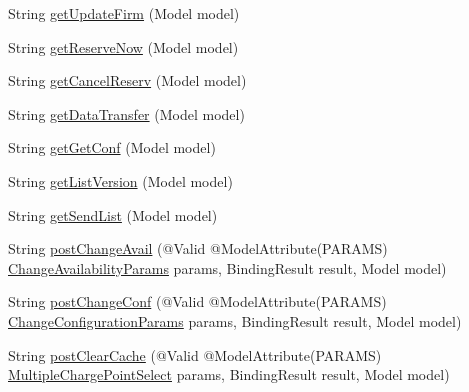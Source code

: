 \begin{DoxyCompactItemize}
\item 
String \hyperlink{classde_1_1rwth_1_1idsg_1_1steve_1_1web_1_1controller_1_1_ocpp15_controller_abbd25891039a971d12dd168ff41d62d2}{get\-Update\-Firm} (Model model)
\item 
String \hyperlink{classde_1_1rwth_1_1idsg_1_1steve_1_1web_1_1controller_1_1_ocpp15_controller_a9ca5f5a51a04291f02d36cdc997f5424}{get\-Reserve\-Now} (Model model)
\item 
String \hyperlink{classde_1_1rwth_1_1idsg_1_1steve_1_1web_1_1controller_1_1_ocpp15_controller_a6f60b7bd2cc240f33cd0428e0ba22d48}{get\-Cancel\-Reserv} (Model model)
\item 
String \hyperlink{classde_1_1rwth_1_1idsg_1_1steve_1_1web_1_1controller_1_1_ocpp15_controller_a6c30b64fcd1d51f7e07601d53328ae40}{get\-Data\-Transfer} (Model model)
\item 
String \hyperlink{classde_1_1rwth_1_1idsg_1_1steve_1_1web_1_1controller_1_1_ocpp15_controller_a3082a555e44506461f53a079ea49a5d5}{get\-Get\-Conf} (Model model)
\item 
String \hyperlink{classde_1_1rwth_1_1idsg_1_1steve_1_1web_1_1controller_1_1_ocpp15_controller_a5642b728ccf142aac65269bdf1d1252d}{get\-List\-Version} (Model model)
\item 
String \hyperlink{classde_1_1rwth_1_1idsg_1_1steve_1_1web_1_1controller_1_1_ocpp15_controller_a08bb9d23d18ef3d73b58bfd4d19abb5d}{get\-Send\-List} (Model model)
\item 
String \hyperlink{classde_1_1rwth_1_1idsg_1_1steve_1_1web_1_1controller_1_1_ocpp15_controller_ab0b8784fb93aa4060bac7b0620a5d1d1}{post\-Change\-Avail} (@Valid @Model\-Attribute(P\-A\-R\-A\-M\-S) \hyperlink{classde_1_1rwth_1_1idsg_1_1steve_1_1web_1_1dto_1_1ocpp12_1_1_change_availability_params}{Change\-Availability\-Params} params, Binding\-Result result, Model model)
\item 
String \hyperlink{classde_1_1rwth_1_1idsg_1_1steve_1_1web_1_1controller_1_1_ocpp15_controller_af68f700ce39665d52d076a055ac0727d}{post\-Change\-Conf} (@Valid @Model\-Attribute(P\-A\-R\-A\-M\-S) \hyperlink{classde_1_1rwth_1_1idsg_1_1steve_1_1web_1_1dto_1_1ocpp12_1_1_change_configuration_params}{Change\-Configuration\-Params} params, Binding\-Result result, Model model)
\item 
String \hyperlink{classde_1_1rwth_1_1idsg_1_1steve_1_1web_1_1controller_1_1_ocpp15_controller_a2bdf99bebd3b873418be2166b2735847}{post\-Clear\-Cache} (@Valid @Model\-Attribute(P\-A\-R\-A\-M\-S) \hyperlink{classde_1_1rwth_1_1idsg_1_1steve_1_1web_1_1dto_1_1common_1_1_multiple_charge_point_select}{Multiple\-Charge\-Point\-Select} params, Binding\-Result result, Model model)

\end{DoxyCompactItemize}

